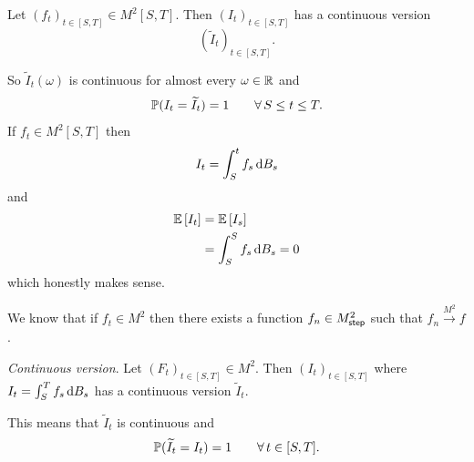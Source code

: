\documentclass[12pt]{report}
\begin{document}
\begin{itemize}
\begin{theorem}
		Let ${\left(f_{t}\right)}_{t\in[S,T]}\in M^{2}[S,T]$. Then ${(I_{t})}_{t\in[S,T]}$ has a continuous version
		\begin{equation*}
			{\left(\widetilde{I}_{t}\right)}_{t\in[S,T]}.
		\end{equation*}
	\end{theorem}
	So $\widetilde{I}_{t}(\omega)$ is continuous for almost every $\omega\in\mathbb{R}$ and
	\begin{equation*}
		\mathbb{P}(I_{t}=\widetilde{I}_{t})=1\qquad\forall\, S\leq t\leq T.
	\end{equation*}
	If $f_{t}\in M^{2}[S,T]$ then
	\begin{equation*}
		I_{t}=\int_{S}^{t}f_{s}\mathop{}\!\mathrm{d} B_{s}
	\end{equation*}
	and
	\begin{align*}
		\mathbb{E}\left[I_{t}\right]&=\mathbb{E}\left[I_{s}\right]\\
		&=\int_{S}^{S}f_{s}\mathop{}\!\mathrm{d} B_{s}=0
	\end{align*}
	which honestly makes sense.
\end{itemize}
We know that if $f_{t}\in M^{2}$ then there exists a function $f_{n}\in M^{2}_{\mathsf{step}}$ such that $f_{n}\xrightarrow{M^{2}}f$.
\begin{theorem}
	\emph{Continuous version}. Let ${(F_{t})}_{t\in[S,T]}\in M^{2}$. Then ${(I_{t})}_{t\in[S,T]}$ where $I_{t}=\int_{S}^{T}f_{s}\mathop{}\!\mathrm{d} B_{s}$ has a continuous version $\widetilde{I}_{t}$.
\end{theorem}
This means that $\widetilde{I}_{t}$ is continuous and 
\begin{equation*}
	\mathbb{P}(\widetilde{I}_{t}=I_{t})=1\qquad\forall\, t\in[S,T].
\end{equation*}
\end{document}

